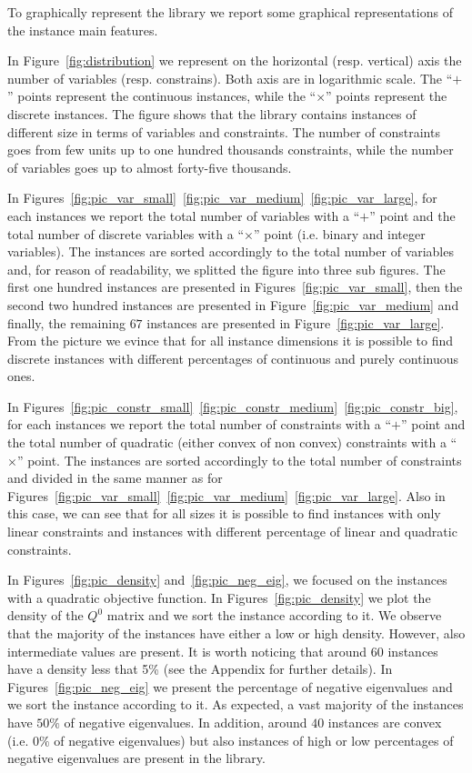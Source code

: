 \begin{enumerate}
To graphically represent the library we report some
graphical representations of the instance main features.

In Figure~\ref{fig:distribution} we represent 
on the horizontal (resp. vertical) axis the number of variables (resp.
constrains). Both axis are in logarithmic scale.
The ``$+$'' points represent  the continuous instances, while the 
``$\times$'' points represent the discrete instances. The figure shows that
the library contains instances of different size in terms of variables
and constraints. The number of constraints goes from few units up to
one hundred thousands constraints, while the number of variables goes
up to almost forty-five thousands.

In Figures~\ref{fig:pic_var_small}~\ref{fig:pic_var_medium}~\ref{fig:pic_var_large},
for each instances we report the total number of variables with a
``$+$'' point and  the total number of discrete variables with a
``$\times$'' point (i.e. binary and integer variables). The instances are
sorted accordingly to the total number of variables and, for reason of
readability, we splitted the figure into three sub figures. The first one hundred
instances are presented in Figures~\ref{fig:pic_var_small},
then the second two hundred instances are presented in
Figure~\ref{fig:pic_var_medium} and finally, the remaining $67$
instances are presented in Figure~\ref{fig:pic_var_large}.
From the picture we evince that for all instance dimensions it is
possible to find discrete instances with different percentages of
continuous and purely continuous ones.



In Figures~\ref{fig:pic_constr_small}~\ref{fig:pic_constr_medium}~\ref{fig:pic_constr_big},
for each instances we report the total number of constraints with a
``$+$'' point and the total number of quadratic (either convex of non
convex) constraints with a ``$\times$'' point. The instances are sorted
accordingly to the total number of constraints  and divided in the
same manner as for Figures~\ref{fig:pic_var_small}~\ref{fig:pic_var_medium}~\ref{fig:pic_var_large}.
Also in this case, we can see that for all sizes it is possible to
find instances with only linear constraints and instances with
different percentage of linear and quadratic constraints.

In Figures~\ref{fig:pic_density} and~\ref{fig:pic_neg_eig},  we
focused on the instances with a quadratic objective function.
In Figures~\ref{fig:pic_density} we plot the density of the $Q^0$
matrix and we sort the instance according to it. We observe that the
majority of the instances have either a low or high density. However,
also intermediate values are present. It is worth noticing that around 60 instances have a 
density less that 5\% (see the Appendix for further details). 
In Figures~\ref{fig:pic_neg_eig} we present  the percentage of
negative eigenvalues and we sort the instance according to it. As
expected, a vast majority of the instances have $50\% $ of negative
eigenvalues. In addition, around $40$ instances are convex (i.e. $0\%$
of negative eigenvalues) but also instances of high or low percentages
of negative eigenvalues are present in the library.



\end{enumerate}
